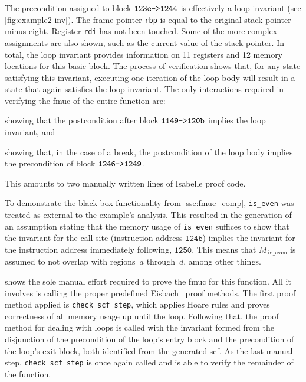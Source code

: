 The precondition assigned to block $\mathtt{123e\texttt{->}1244}$
is effectively a loop invariant (see \cref{fig:example2-inv}).%
The frame pointer \lstinline|rbp|%
is equal to the original stack pointer minus eight.%
Register \lstinline|rdi| has not been touched.
Some of the more complex assignments are also shown,
such as the current value of the stack pointer.
In total, the loop invariant provides information
on 11 registers and 12 memory locations for this basic block.%
The process of verification shows that,
for any state satisfying this invariant,
executing one iteration of the loop body
will result in a state that again satisfies the loop invariant.
The only interactions required in verifying the \ac{fmuc} of the entire function are:
\begin{enumerate*}
  \item showing that the postcondition after block $\mathtt{1149\texttt{->}120b}$
  implies the loop invariant, and
  \item showing that, in the case of a break, the postcondition of the loop body
  implies the precondition of block $\mathtt{1246\texttt{->}1249}$.
\end{enumerate*}
This amounts to two manually written lines of Isabelle proof code.  

To demonstrate the black-box functionality from \cref{sse:fmuc_comp},
\lstinline|is_even| was treated as external to the example's analysis.
This resulted in the generation of an assumption
stating that the memory usage of \lstinline|is_even| suffices to show that
the invariant for the call site (instruction address $\mathtt{124b}$)
implies the invariant for the instruction address immediately following,
$\mathtt{1250}$.
This means that $M_\mathtt{is\_even}$
is assumed to not overlap with regions~$a$ through~$d$, among other things.

 shows the sole manual effort required
to prove the \ac{fmuc} for this function.
All it involves is calling the proper predefined Eisbach~\citep{matichuk2016eisbach}
proof methods.
The first proof method applied is \lstinline|check_scf_step|,
which applies Hoare rules and proves correctness of all memory usage
up until the loop.
Following that, the proof method for dealing with loops
is called with the invariant formed from the disjunction
of the precondition of the loop's entry block
and the precondition of the loop's exit block,
both identified from the generated \ac{scf}.
As the last manual step, \lstinline|check_scf_step| is once again called
and is able to verify the remainder of the function.

